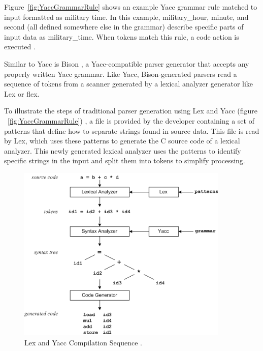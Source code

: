 \indent
Figure~\ref{fig:YaccGrammarRule} shows an example Yacc grammar rule matched to input formatted as military time.  In this example, military\_hour, minute, and second (all defined somewhere else in the grammar) describe specific parts of input data as military\_time.  When tokens match this rule, a code action is executed \cite{johnson_01,niemann_01}.

\indent
Similar to Yacc is Bison \cite{aycock_01,demaille_01}, a Yacc-compatible parser generator that accepts any properly written Yacc grammar.  Like Yacc, Bison-generated parsers read a sequence of tokens from a scanner generated by a lexical analyzer generator like Lex or flex.

\indent
To illustrate the steps of traditional parser generation using Lex and Yacc (figure ~\ref{fig:YaccGrammarRule}) \cite{johnson_01,lesk_01,niemann_01}, a file is provided by the developer containing a set of patterns that define how to separate strings found in source data.  This file is read by Lex, which uses these patterns to generate the C source code of a lexical analyzer.  This newly generated lexical analyzer uses the patterns to identify specific strings in the input and split them into tokens to simplify processing.

\begin{figure}[htbp]
\centering
\includegraphics[width=0.9\textwidth]{figures/LexAndYaccCompileSequence.png}
\caption[Lex and Yacc Compilation Sequence]{Lex and Yacc Compilation Sequence \cite{niemann_01}.}
\label{fig:LexAndYaccCompileSequence}
\end{figure}

